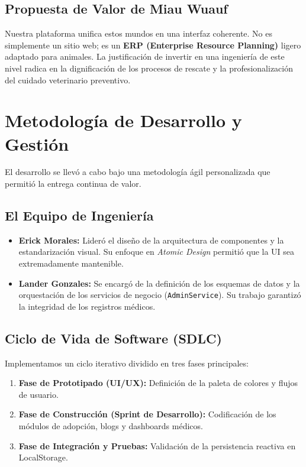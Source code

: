 \documentclass[12pt,a4paper,oneside]{report}
\begin{document}
\section{Propuesta de Valor de Miau Wuauf}
Nuestra plataforma unifica estos mundos en una interfaz coherente. No es simplemente un sitio web; es un \textbf{ERP (Enterprise Resource Planning)} ligero adaptado para animales. La justificación de invertir en una ingeniería de este nivel radica en la dignificación de los procesos de rescate y la profesionalización del cuidado veterinario preventivo.

\chapter{Metodología de Desarrollo y Gestión}

El desarrollo se llevó a cabo bajo una metodología ágil personalizada que permitió la entrega continua de valor.

\section{El Equipo de Ingeniería}
\begin{itemize}
    \item \textbf{Erick Morales:} Lideró el diseño de la arquitectura de componentes y la estandarización visual. Su enfoque en \textit{Atomic Design} permitió que la UI sea extremadamente mantenible.
    \item \textbf{Lander Gonzales:} Se encargó de la definición de los esquemas de datos y la orquestación de los servicios de negocio (\texttt{AdminService}). Su trabajo garantizó la integridad de los registros médicos.
\end{itemize}

\section{Ciclo de Vida de Software (SDLC)}
Implementamos un ciclo iterativo dividido en tres fases principales:
\begin{enumerate}
    \item \textbf{Fase de Prototipado (UI/UX):} Definición de la paleta de colores y flujos de usuario.
    \item \textbf{Fase de Construcción (Sprint de Desarrollo):} Codificación de los módulos de adopción, blogs y dashboards médicos.
    \item \textbf{Fase de Integración y Pruebas:} Validación de la persistencia reactiva en LocalStorage.
\end{enumerate}
\end{document}
